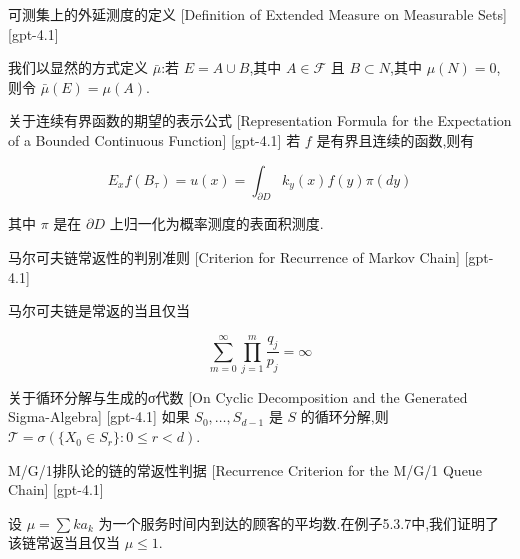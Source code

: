 \documentclass[UTF8]{ctexart}
\begin{document}
    
    
    \begin{dfn}
        {可测集上的外延测度的定义}
        [Definition of Extended Measure on Measurable Sets]
        [gpt-4.1]
        
我们以显然的方式定义 $\bar{\mu}$:若 $E = A \cup B$,其中 $A \in {\mathcal{F}}$ 且 $B \subset N$,其中 $\mu(N) = 0$,则令 ${\bar{\mu}}(E) = \mu(A)$.

    \end{dfn}
    
    
    
    \begin{thm}
        {关于连续有界函数的期望的表示公式}
        [Representation Formula for the Expectation of a Bounded Continuous Function]
        [gpt-4.1]
        若 $f$ 是有界且连续的函数,则有

\[
E_x f(B_\tau) = u(x) = \int_{\partial D} k_y(x) f(y) \pi(dy)
\]

其中 $\pi$ 是在 $\partial D$ 上归一化为概率测度的表面积测度.
    \end{thm}
    
    
    
    \begin{thm}
        {马尔可夫链常返性的判别准则}
        [Criterion for Recurrence of Markov Chain]
        [gpt-4.1]
        
马尔可夫链是常返的当且仅当

\[
\sum _ { m = 0 } ^ { \infty } \prod _ { j = 1 } ^ { m } { \frac { q _ { j } } { p _ { j } } } = \infty
\]

    \end{thm}
    
    
    
    \begin{thm}
        {关于循环分解与生成的σ代数}
        [On Cyclic Decomposition and the Generated Sigma-Algebra]
        [gpt-4.1]
        如果 $S_{0}, \ldots, S_{d-1}$ 是 $S$ 的循环分解,则 $\mathcal{T} = \sigma(\{X_{0} \in S_{r}\} : 0 \leq r < d)$.
    \end{thm}
    
    
    
    \begin{thm}
        {M/G/1排队论的链的常返性判据}
        [Recurrence Criterion for the M/G/1 Queue Chain]
        [gpt-4.1]
        
设 $\mu = \sum k a_{k}$ 为一个服务时间内到达的顾客的平均数.在例子5.3.7中,我们证明了该链常返当且仅当 $\mu \leq 1$.

    \end{thm}
    
\end{document}
